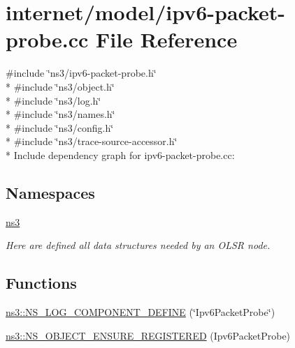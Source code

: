 \hypertarget{ipv6-packet-probe_8cc}{}\section{internet/model/ipv6-\/packet-\/probe.cc File Reference}
\label{ipv6-packet-probe_8cc}
{\ttfamily \#include \char`\"{}ns3/ipv6-\/packet-\/probe.\+h\char`\"{}}\\*
{\ttfamily \#include \char`\"{}ns3/object.\+h\char`\"{}}\\*
{\ttfamily \#include \char`\"{}ns3/log.\+h\char`\"{}}\\*
{\ttfamily \#include \char`\"{}ns3/names.\+h\char`\"{}}\\*
{\ttfamily \#include \char`\"{}ns3/config.\+h\char`\"{}}\\*
{\ttfamily \#include \char`\"{}ns3/trace-\/source-\/accessor.\+h\char`\"{}}\\*
Include dependency graph for ipv6-\/packet-\/probe.cc\+:
\subsection*{Namespaces}
\begin{DoxyCompactItemize}
\item 
 \hyperlink{namespacens3}{ns3}
\begin{DoxyCompactList}\small\item\em Here are defined all data structures needed by an O\+L\+SR node. \end{DoxyCompactList}\end{DoxyCompactItemize}
\subsection*{Functions}
\begin{DoxyCompactItemize}
\item 
\hyperlink{namespacens3_ad96d0b790eb218743a83995c5aaccfc9}{ns3\+::\+N\+S\+\_\+\+L\+O\+G\+\_\+\+C\+O\+M\+P\+O\+N\+E\+N\+T\+\_\+\+D\+E\+F\+I\+NE} (\char`\"{}Ipv6\+Packet\+Probe\char`\"{})
\item 
\hyperlink{namespacens3_a021074ef61b81cfec34df00f6828daab}{ns3\+::\+N\+S\+\_\+\+O\+B\+J\+E\+C\+T\+\_\+\+E\+N\+S\+U\+R\+E\+\_\+\+R\+E\+G\+I\+S\+T\+E\+R\+ED} (Ipv6\+Packet\+Probe)
\end{DoxyCompactItemize}

